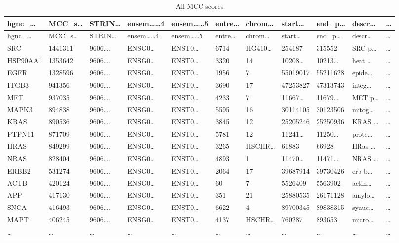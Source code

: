 \documentclass[
]{article}
\begin{document}
\begin{longtable}[]{@{}lllllllllll@{}}
\caption{\label{tab:all-MCC-scores}All MCC scores}\tabularnewline
\toprule
hgnc\_\ldots{} & MCC\_s\ldots{} & STRIN\ldots{} & ensem\ldots\ldots4 & ensem\ldots\ldots5 & entre\ldots{} & chrom\ldots{} & start\ldots{} & end\_p\ldots{} & descr\ldots{} & \ldots{}\tabularnewline
\midrule
\endfirsthead
\toprule
hgnc\_\ldots{} & MCC\_s\ldots{} & STRIN\ldots{} & ensem\ldots\ldots4 & ensem\ldots\ldots5 & entre\ldots{} & chrom\ldots{} & start\ldots{} & end\_p\ldots{} & descr\ldots{} & \ldots{}\tabularnewline
\midrule
\endhead
SRC & 1441311 & 9606\ldots. & ENSG0\ldots{} & ENST0\ldots{} & 6714 & HG410\ldots{} & 254187 & 315552 & SRC p\ldots{} & \ldots{}\tabularnewline
HSP90AA1 & 1353642 & 9606\ldots. & ENSG0\ldots{} & ENST0\ldots{} & 3320 & 14 & 10208\ldots{} & 10213\ldots{} & heat \ldots{} & \ldots{}\tabularnewline
EGFR & 1328596 & 9606\ldots. & ENSG0\ldots{} & ENST0\ldots{} & 1956 & 7 & 55019017 & 55211628 & epide\ldots{} & \ldots{}\tabularnewline
ITGB3 & 941356 & 9606\ldots. & ENSG0\ldots{} & ENST0\ldots{} & 3690 & 17 & 47253827 & 47313743 & integ\ldots{} & \ldots{}\tabularnewline
MET & 937035 & 9606\ldots. & ENSG0\ldots{} & ENST0\ldots{} & 4233 & 7 & 11667\ldots{} & 11679\ldots{} & MET p\ldots{} & \ldots{}\tabularnewline
MAPK3 & 894838 & 9606\ldots. & ENSG0\ldots{} & ENST0\ldots{} & 5595 & 16 & 30114105 & 30123506 & mitog\ldots{} & \ldots{}\tabularnewline
KRAS & 890536 & 9606\ldots. & ENSG0\ldots{} & ENST0\ldots{} & 3845 & 12 & 25205246 & 25250936 & KRAS \ldots{} & \ldots{}\tabularnewline
PTPN11 & 871709 & 9606\ldots. & ENSG0\ldots{} & ENST0\ldots{} & 5781 & 12 & 11241\ldots{} & 11250\ldots{} & prote\ldots{} & \ldots{}\tabularnewline
HRAS & 849299 & 9606\ldots. & ENSG0\ldots{} & ENST0\ldots{} & 3265 & HSCHR\ldots{} & 61883 & 66928 & HRas \ldots{} & \ldots{}\tabularnewline
NRAS & 828404 & 9606\ldots. & ENSG0\ldots{} & ENST0\ldots{} & 4893 & 1 & 11470\ldots{} & 11471\ldots{} & NRAS \ldots{} & \ldots{}\tabularnewline
ERBB2 & 531274 & 9606\ldots. & ENSG0\ldots{} & ENST0\ldots{} & 2064 & 17 & 39687914 & 39730426 & erb-b\ldots{} & \ldots{}\tabularnewline
ACTB & 420124 & 9606\ldots. & ENSG0\ldots{} & ENST0\ldots{} & 60 & 7 & 5526409 & 5563902 & actin\ldots{} & \ldots{}\tabularnewline
APP & 417130 & 9606\ldots. & ENSG0\ldots{} & ENST0\ldots{} & 351 & 21 & 25880535 & 26171128 & amylo\ldots{} & \ldots{}\tabularnewline
SNCA & 416493 & 9606\ldots. & ENSG0\ldots{} & ENST0\ldots{} & 6622 & 4 & 89700345 & 89838315 & synuc\ldots{} & \ldots{}\tabularnewline
MAPT & 406245 & 9606\ldots. & ENSG0\ldots{} & ENST0\ldots{} & 4137 & HSCHR\ldots{} & 760287 & 893653 & micro\ldots{} & \ldots{}\tabularnewline
\ldots{} & \ldots{} & \ldots{} & \ldots{} & \ldots{} & \ldots{} & \ldots{} & \ldots{} & \ldots{} & \ldots{} & \ldots{}\tabularnewline
\bottomrule
\end{longtable}
\end{document}
